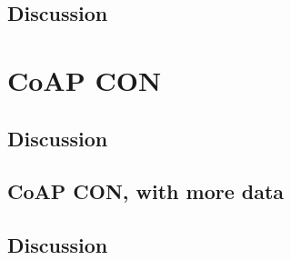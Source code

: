\subsection{Discussion}

\section{CoAP CON}

\subsection{Discussion}

\subsection{CoAP CON, with more data}

\subsection{Discussion}

